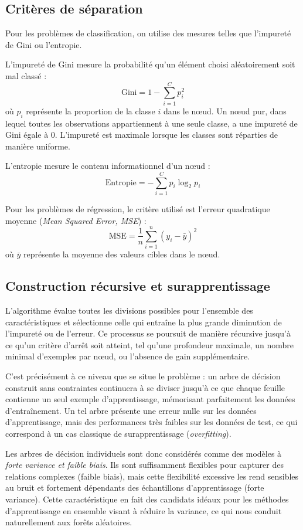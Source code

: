 \subsection{Critères de séparation}

Pour les problèmes de classification, on utilise des mesures telles que l’impureté de Gini ou l’entropie.

L’impureté de Gini mesure la probabilité qu’un élément choisi aléatoirement soit mal classé :
\[
\text{Gini} = 1 - \sum_{i=1}^{C} p_i^2
\]
où $p_i$ représente la proportion de la classe $i$ dans le nœud. Un nœud pur, dans lequel toutes les observations appartiennent à une seule classe, a une impureté de Gini égale à 0. L’impureté est maximale lorsque les classes sont réparties de manière uniforme.

L’entropie mesure le contenu informationnel d’un nœud :
\[
\text{Entropie} = - \sum_{i=1}^{C} p_i \log_2 p_i
\]

Pour les problèmes de régression, le critère utilisé est l’erreur quadratique moyenne (\emph{Mean Squared Error, MSE}) :
\[
\text{MSE} = \frac{1}{n} \sum_{i=1}^{n} (y_i - \bar{y})^2
\]
où $\bar{y}$ représente la moyenne des valeurs cibles dans le nœud.

\subsection{Construction récursive et surapprentissage}

L’algorithme évalue toutes les divisions possibles pour l’ensemble des caractéristiques et sélectionne celle qui entraîne la plus grande diminution de l’impureté ou de l’erreur. Ce processus se poursuit de manière récursive jusqu’à ce qu’un critère d’arrêt soit atteint, tel qu’une profondeur maximale, un nombre minimal d’exemples par nœud, ou l’absence de gain supplémentaire.

C’est précisément à ce niveau que se situe le problème : un arbre de décision construit sans contraintes continuera à se diviser jusqu’à ce que chaque feuille contienne un seul exemple d’apprentissage, mémorisant parfaitement les données d’entraînement. Un tel arbre présente une erreur nulle sur les données d’apprentissage, mais des performances très faibles sur les données de test, ce qui correspond à un cas classique de surapprentissage (\emph{overfitting}).

Les arbres de décision individuels sont donc considérés comme des modèles à \emph{forte variance et faible biais}. Ils sont suffisamment flexibles pour capturer des relations complexes (faible biais), mais cette flexibilité excessive les rend sensibles au bruit et fortement dépendants des échantillons d’apprentissage (forte variance). Cette caractéristique en fait des candidats idéaux pour les méthodes d’apprentissage en ensemble visant à réduire la variance, ce qui nous conduit naturellement aux forêts aléatoires.


